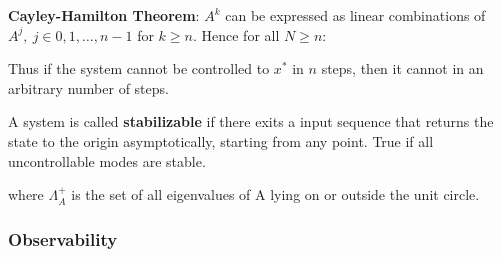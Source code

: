 \documentclass[8pt,a4paper]{scrartcl}
\begin{document}
\begin{multicols*}{3}
\begin{multicols*}{4}
{

\textbf{Cayley-Hamilton Theorem}: $A^k$ can be expressed as linear combinations of $A^j,\ j\in0,1,\ldots,n-1$ for $k\geq n$. Hence for all $N\geq n$:


Thus if the system cannot be controlled to $x^\ast$ in $n$ steps, then it cannot in an arbitrary number of steps.
}%




A system is called \textbf{stabilizable} if there exits a input sequence that returns the state to the origin asymptotically, starting from any point. True if all uncontrollable modes are stable.


where $\Lambda_A^+$ is the set of all eigenvalues of A lying on or outside the unit circle.

\subsubsection{Observability}


\end{multicols*}
\end{multicols*}
\end{document}

